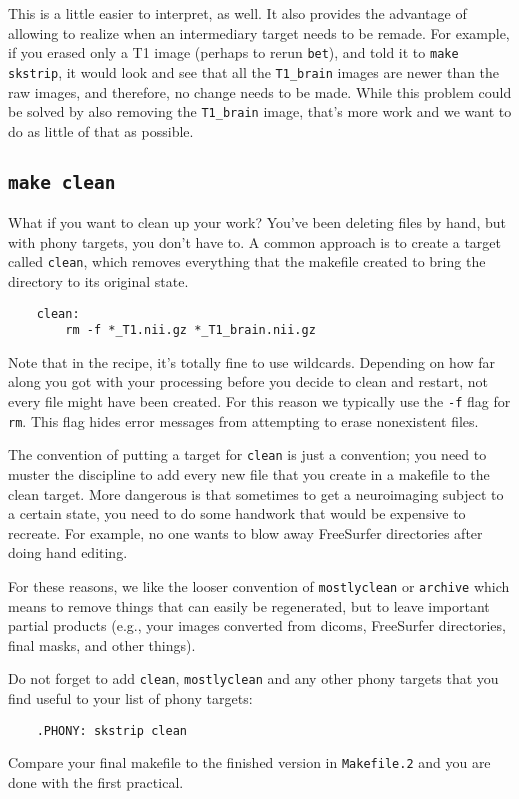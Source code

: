 This is a little easier to interpret, as well. It also provides the advantage of allowing \maken{} to realize when an intermediary target needs to be remade. For example, if you erased only a T1 image (perhaps to rerun \texttt{bet}), and told it to \texttt{make skstrip}, it would look and see that all the \texttt{T1_brain} images are newer than the raw images, and therefore, no change needs to be made. While this problem could be solved by also removing the \texttt{T1_brain} image, that's more work and we want to do as little of that as possible.

\subsection{\texttt{make clean}}

What if you want to clean up your work? You've been deleting files by
hand, but with phony targets, you don't have to. A common approach is to create a target called \texttt{clean}, which removes everything that the makefile created to bring the directory to its original state.


\begin{lstlisting}
	clean:
		rm -f *_T1.nii.gz *_T1_brain.nii.gz
\end{lstlisting}

Note that in the recipe, it's totally fine to use wildcards. Depending on how far along you got with your processing before you decide to clean and restart, not every file might have been created.  For this reason we typically use the \texttt{-f} flag for \texttt{rm}. This flag hides error messages from attempting to erase nonexistent files. 

The convention of putting a target for \texttt{clean} is just a convention; you need to muster the discipline to add every new file that you create in a makefile to the clean target. More dangerous is that sometimes to get a neuroimaging subject to a certain state, you need to do some handwork that would be expensive to recreate. For example, no one wants to blow away FreeSurfer directories after doing hand editing. 

For these reasons, we like the looser convention of \texttt{mostlyclean} or \texttt{archive} which means to remove things that can easily be regenerated, but to leave important partial products (e.g., your images converted from dicoms, FreeSurfer directories, final masks, and other things).

Do not forget to add \texttt{clean}, \texttt{mostlyclean} and any other phony targets that you find useful to your list of phony targets:
\begin{lstlisting}
	.PHONY: skstrip clean
\end{lstlisting}

Compare your final makefile to the finished version in \texttt{Makefile.2} and you are done with the first practical.

